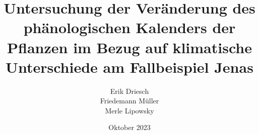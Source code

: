 \documentclass[12pt]{report}
\title{Untersuchung der Veränderung des phänologischen Kalenders der Pflanzen im Bezug auf klimatische Unterschiede am Fallbeispiel Jenas}
\institute{\large Staatliche Gemeinschaftsschule Kaleidoskop Jena}
\author{\Large Erik Driesch \\ Friedemann Müller \\ Merle Lipowsky}
\date{Oktober 2023}
\begin{document}
\setmainfont{Arial} %
\maketitle
\setcounter{page}{2} %

\renewcommand{\contentsname}{Inhaltsverzeichnis}
\tableofcontents
\newpage









%
%
\end{document}
